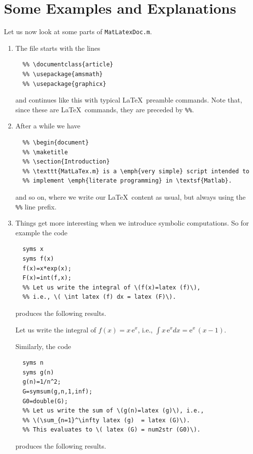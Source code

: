 \documentclass{article}
\begin{document}
  \section{Some Examples and Explanations} 
  Let us now look at some parts of \texttt{MatLatexDoc.m}. 
  \begin{enumerate} 
  \item The file starts with the lines  
  \begin{lstlisting} 
  %% \documentclass{article} 
  %% \usepackage{amsmath} 
  %% \usepackage{graphicx} 
  \end{lstlisting} 
  and continues like this with typical \LaTeX\ preamble commands. Note that, since these are  
  \LaTeX\ commands, they are preceded by \texttt{\%\%}. 
  \item After a while we have   
  \begin{lstlisting} 
  %% \begin{document} 
  %% \maketitle 
  %% \section{Introduction} 
  %% \texttt{MatLaTex.m} is a \emph{very simple} script intended to  
  %% implement \emph{literate programming} in \textsf{Matlab}.  
  \end{lstlisting} 
  and so on, where we write our \LaTeX\ content as usual, but always using the \texttt{\%\%} line prefix. 
  \item Things get more interesting when we introduce symbolic computations. So for example the code  
  \begin{lstlisting} 
  syms x 
  syms f(x) 
  f(x)=x*exp(x); 
  F(x)=int(f,x); 
  %% Let us write the integral of \(f(x)=latex (f)\),  
  %% i.e., \( \int latex (f) dx = latex (F)\). 
  \end{lstlisting} 
  produces the following results. 
   
  \qquad Let us write the integral of \(f(x)=x\,{\mathrm{e}}^x\), i.e., \( \int x\,{\mathrm{e}}^x dx = {\mathrm{e}}^x\,\left(x-1\right)\). 
  
  Similarly,  the code 
  \begin{lstlisting} 
  syms n 
  syms g(n) 
  g(n)=1/n^2; 
  G=symsum(g,n,1,inf); 
  G0=double(G); 
  %% Let us write the sum of \(g(n)=latex (g)\), i.e.,  
  %% \(\sum_{n=1}^\infty latex (g)  = latex (G)\).  
  %% This evaluates to \( latex (G) = num2str (G0)\).  
  \end{lstlisting} 
  produces the following results. 
  

\end{enumerate}
\end{document}
